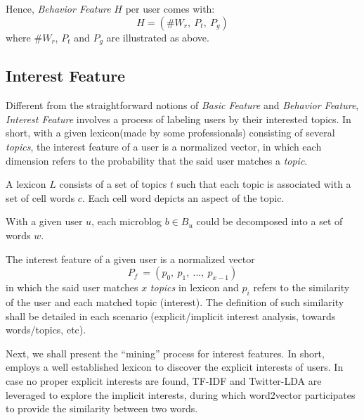 Hence, \textit{Behavior Feature} $H$ per user comes with:
\begin{equation}
\label{eq:beha}
	H = (\#W_r,\ P_t,\ P_g)
\end{equation}
where $\#W_r$, $P_t$ and $P_g$ are illustrated as above.

\subsection{Interest Feature}

Different from the straightforward notions of \textit{Basic Feature} and \textit{Behavior Feature}, \textit{Interest Feature} involves a process of labeling users by their interested topics.
In short, with a given lexicon(made by some professionals) consisting of several \textit{topics}, the interest feature of a user is a normalized vector, in which each dimension refers to the probability that the said user matches a \textit{topic}.

\begin{definition}
\label{def:lexi}
A lexicon $L$ consists of a set of topics $t$ such that each topic is associated with a set of cell words $c$. Each cell word depicts an aspect of the topic.
\end{definition}

\begin{definition}
\label{def:bw}
With a given user $u$, each microblog $b \in B_u$ could be decomposed into a set of words $w$.
\end{definition}

\begin{definition}
\label{def:inte}
The interest feature of a given user is a normalized vector
\begin{equation}
\label{eq:inte}
P_f\ = (p_0,\ p_1,\ ...,\ p_{x-1})
\end{equation}
in which the said user matches $x$ \textit{topics} in lexicon and $p_i$ refers to the similarity of the user and each matched topic (interest). The definition of such similarity shall be detailed in each scenario (explicit/implicit interest analysis, towards words/topics, etc).
\end{definition}


Next, we shall present the ``mining'' process for interest features.
In short, \sys{} employs a well established lexicon to discover the explicit interests of users.
In case no proper explicit interests are found, TF-IDF and Twitter-LDA are leveraged to explore the implicit interests, during which word2vector participates to provide the similarity between two words.

